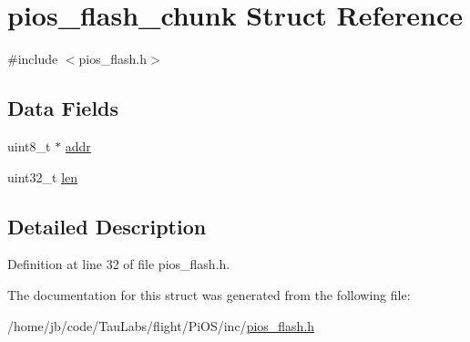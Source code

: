 \hypertarget{structpios__flash__chunk}{\section{pios\-\_\-flash\-\_\-chunk \-Struct \-Reference}
\label{structpios__flash__chunk}
}


{\ttfamily \#include $<$pios\-\_\-flash.\-h$>$}

\subsection*{\-Data \-Fields}
\begin{DoxyCompactItemize}
\item 
uint8\-\_\-t $\ast$ \hyperlink{group___p_i_o_s___f_l_a_s_h_gab6bdf89325e231293b582afee4e49e9b}{addr}
\item 
uint32\-\_\-t \hyperlink{group___p_i_o_s___f_l_a_s_h_ga127467a644fb34d50d9c074535dcaec3}{len}
\end{DoxyCompactItemize}


\subsection{\-Detailed \-Description}


\-Definition at line 32 of file pios\-\_\-flash.\-h.



\-The documentation for this struct was generated from the following file\-:\begin{DoxyCompactItemize}
\item 
/home/jb/code/\-Tau\-Labs/flight/\-Pi\-O\-S/inc/\hyperlink{pios__flash_8h}{pios\-\_\-flash.\-h}\end{DoxyCompactItemize}
